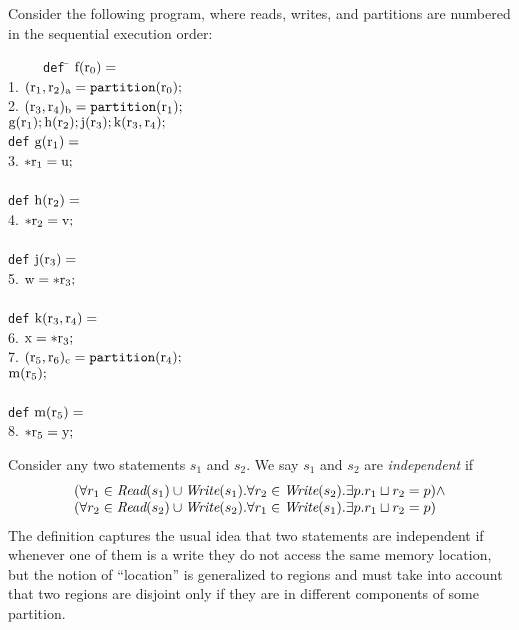 Consider the following program, where reads, writes, and partitions are numbered in the sequential execution order:
{\small 
\begin{tabbing}
\ \ \ \ \ \= {\tt def} \= $\rm f(r_0) =$ \\
1. \>\>   $\rm (r_1,r_2)_a = \mbox{\tt partition}(r_0);$   \\
2. \>\>  $\rm (r_3,r_4)_b = \mbox{\tt partition}(r_1);$ \\
\>\>     $\rm g(r_1); h(r_2); j(r_3); k(r_3,r_4);$ \\
\> {\tt def} $\rm g(r_1) =$   \\
3. \>\>  $\rm \ast r_1 = u;$ \\ \\
\> {\tt def} $\rm h(r_2) =$ \\      
4. \>\>   $\rm \ast r_2 = v;$\\ \\
\> {\tt def} $\rm j(r_3) = $ \\
5.\>\>   $\rm w = \ast r_3;$ \\ \\
\> {\tt def} $\rm k(r_3,r_4) = $\\
6.\>\>   $\rm x = \ast r_3;$ \\
7.\>\>   $\rm (r_5,r_6)_c = \mbox{\tt partition}(r_4);$ \\ 
\>\>     $\rm m(r_5);$ \\ \\
\> {\tt def} $\rm m(r_5) = $ \\
8. \>\>  $\rm \ast r_5 = y;$
\end{tabbing}
}

Consider any two statements $s_1$ and $s_2$.  We say $s_1$ and $s_2$ are {\em independent} if
\[
\begin{array}{l}
   (\forall r_1 \in \mbox{\em Read}(s_1) \cup \mbox{\em Write}(s_1).\forall r_2 \in \mbox{\em Write}(s_2). \exists p. r_1 \sqcup r_2 = p) \wedge \\
   (\forall r_2 \in \mbox{\em Read}(s_2) \cup \mbox{\em Write}(s_2).\forall r_1 \in \mbox{\em Write}(s_1). \exists p. r_1 \sqcup r_2 = p)
\end{array}
\]
The definition captures the usual idea that two statements are independent if whenever one of them is a write they do not access the same memory location, but the notion of ``location'' is generalized to regions and must take into account that two regions
are disjoint only if they are in different components of some partition.

